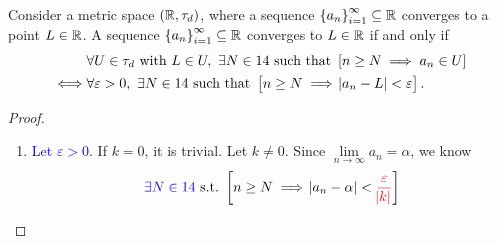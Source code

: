 \documentclass[11pt,openany]{article}
\begin{document}
\newpage
\begin{note}[]
Consider a metric space $(\mathbb{R},\tau_d)$, where a sequence $\set{a_n}_{i=1}^\infty\subseteq \mathbb{R}$ converges to a point $L\in \mathbb{R}$. A sequence $\set{a_n}_{i=1}^\infty\subseteq \mathbb{R}$ converges to $L\in\mathbb{R}$ if and only if 
\begin{align*}
&\forall U\in\tau_d\ \text{with}\ L\in U,\ \exists N\in\N\ \text{such that}\ \left[ n\geq N\implies a_n\in U\right]\\
\iff&\forall\varepsilon>0,\ \exists N\in\N\ \text{such that}\ \left[ n\geq N\implies \abs{a_n-L}<\varepsilon\right].
\end{align*}

\begin{proof}	
\ \begin{flushleft}
\begin{minipage}[t]{0.495\textwidth}
\begin{enumerate}[(1)]
	\item \textcolor{blue}{Let $\varepsilon>0$}. If $k=0$, it is trivial. Let $k\neq 0$. Since $\lim\limits_{n\to\infty}a_n=\alpha$, we know \[
	\textcolor{blue}{\exists N\in\N}\ \text{s.t.}\ \left[n\geq N\implies\abs{a_n-\alpha}<\textcolor{red}{\frac{\varepsilon}{\abs{k}}}\right]
\]
\end{enumerate}
\end{minipage}
\end{flushleft}
\end{proof}
\end{note}
\end{document}
